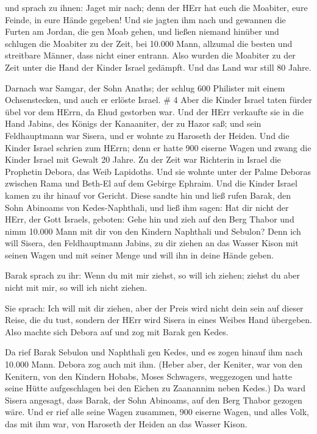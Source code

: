  und sprach zu ihnen: Jaget mir nach; denn der HErr hat
euch die Moabiter, eure Feinde, in eure Hände gegeben! Und sie jagten
ihm nach und gewannen die Furten am Jordan, die gen Moab gehen, und
ließen niemand hinüber  und schlugen die Moabiter zu der
Zeit, bei 10.000 Mann, allzumal die besten und streitbare Männer, dass
nicht einer entrann.  Also wurden die Moabiter zu der Zeit
unter die Hand der Kinder Israel gedämpft. Und das Land war still 80
Jahre.

 Darnach war Samgar, der Sohn Anaths; der schlug 600
Philister mit einem Ochsenstecken, und auch er erlöste Israel. \# 4
 Aber die Kinder Israel taten fürder übel vor dem HErrn, da
Ehud gestorben war.  Und der HErr verkaufte sie in die Hand
Jabins, des Königs der Kanaaniter, der zu Hazor saß; und sein
Feldhauptmann war Sisera, und er wohnte zu Haroseth der Heiden.
 Und die Kinder Israel schrien zum HErrn; denn er hatte 900
eiserne Wagen und zwang die Kinder Israel mit Gewalt 20 Jahre.
 Zu der Zeit war Richterin in Israel die Prophetin Debora,
das Weib Lapidoths.  Und sie wohnte unter der Palme Deboras
zwischen Rama und Beth-El auf dem Gebirge Ephraim. Und die Kinder Israel
kamen zu ihr hinauf vor Gericht.  Diese sandte hin und ließ
rufen Barak, den Sohn Abinoams von Kedes-Naphthali, und ließ ihm sagen:
Hat dir nicht der HErr, der Gott Israels, geboten: Gehe hin und zieh auf
den Berg Thabor und nimm 10.000 Mann mit dir von den Kindern Naphthali
und Sebulon?  Denn ich will Sisera, den Feldhauptmann
Jabins, zu dir ziehen an das Wasser Kison mit seinen Wagen und mit
seiner Menge und will ihn in deine Hände geben.

 Barak sprach zu ihr: Wenn du mit mir ziehst, so will ich
ziehen; ziehst du aber nicht mit mir, so will ich nicht ziehen.

 Sie sprach: Ich will mit dir ziehen, aber der Preis wird
nicht dein sein auf dieser Reise, die du tust, sondern der HErr wird
Sisera in eines Weibes Hand übergeben. Also machte sich Debora auf und
zog mit Barak gen Kedes.

 Da rief Barak Sebulon und Naphthali gen Kedes, und es
zogen hinauf ihm nach 10.000 Mann. Debora zog auch mit ihm.
 (Heber aber, der Keniter, war von den Kenitern, von den
Kindern Hobabs, Moses Schwagers, weggezogen und hatte seine Hütte
aufgeschlagen bei den Eichen zu Zaanannim neben Kedes.)  Da
ward Sisera angesagt, dass Barak, der Sohn Abinoams, auf den Berg Thabor
gezogen wäre.  Und er rief alle seine Wagen zusammen, 900
eiserne Wagen, und alles Volk, das mit ihm war, von Haroseth der Heiden
an das Wasser Kison.

